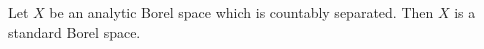 Let $X$ be an analytic Borel space which is countably separated. Then $X$ is a standard Borel space.
